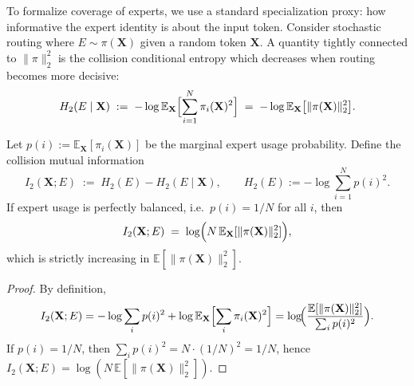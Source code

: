 \documentclass[sigconf,nonacm]{acmart}
\begin{document}
To formalize coverage of experts, we use a standard specialization proxy:
how informative the expert identity is about the input token.
Consider stochastic routing where $E\sim \pi(\mathbf{X})$ given a random token $\mathbf{X}$.
A quantity tightly connected to $\|\pi\|_2^2$ is the collision conditional entropy which decreases when routing becomes more decisive:
\[
H_2(E\mid \mathbf{X})
\;:=\;
-\log \mathbb{E}_{\mathbf{X}}\Bigl[\sum_{i=1}^N \pi_i(\mathbf{X})^2\Bigr]
\;=\;
-\log \mathbb{E}_{\mathbf{X}}\bigl[\|\pi(\mathbf{X})\|_2^2\bigr].
\]

\begin{theorem}
\label{thm:renyi-mi}
Let $p(i):=\mathbb{E}_{\mathbf{X}}[\pi_i(\mathbf{X})]$ be the marginal expert usage probability.
Define the collision mutual information
\[
I_2(\mathbf{X};E)
\;:=\;
H_2(E) - H_2(E\mid \mathbf{X}),
\qquad
H_2(E):=-\log\sum_{i=1}^N p(i)^2.
\]
If expert usage is perfectly balanced, i.e.\ $p(i)=1/N$ for all $i$, then
\[
I_2(\mathbf{X};E)
\;=\;
\log\Bigl(N\,\mathbb{E}_{\mathbf{X}}[\|\pi(\mathbf{X})\|_2^2]\Bigr),
\]
which is strictly increasing in $\mathbb{E}[\|\pi(\mathbf{X})\|_2^2]$.
\end{theorem}

\begin{proof}
By definition,
\[
I_2(\mathbf{X};E)
= -\log\sum_i p(i)^2 + \log \mathbb{E}_{\mathbf{X}}\Bigl[\sum_i \pi_i(\mathbf{X})^2\Bigr]
= \log\!\Bigl(\frac{\mathbb{E}[\|\pi(\mathbf{X})\|_2^2]}{\sum_i p(i)^2}\Bigr).
\]
If $p(i)=1/N$, then $\sum_i p(i)^2 = N\cdot (1/N)^2 = 1/N$, hence
$I_2(\mathbf{X};E)=\log(N\,\mathbb{E}[\|\pi(\mathbf{X})\|_2^2])$.
\end{proof}

\end{document}
